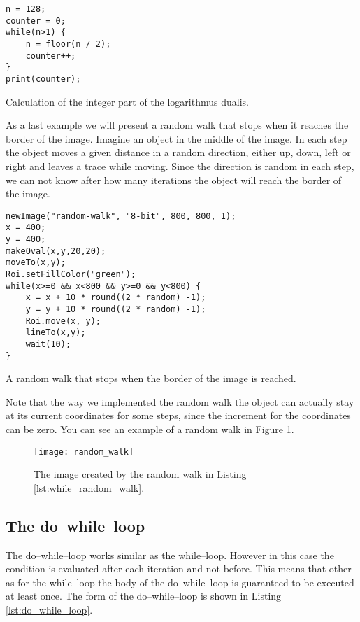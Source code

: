 \begin{listing}[H]
\begin{verbatim}
n = 128;
counter = 0;
while(n>1) {
	n = floor(n / 2);
	counter++;
}
print(counter);
\end{verbatim}
\caption{Calculation of the integer part of the logarithmus dualis.}
\label{lst:while_loop_log_dualis}
\end{listing}

As a last example we will present a random walk that stops when it reaches the border of the image. Imagine an object in the middle of the image. In each step the object moves a given distance in a random direction, either up, down, left or right and leaves a trace while moving. Since the direction is random in each step, we can not know after how many iterations the object will reach the border of the image.

\begin{listing}[H]
\begin{verbatim}
newImage("random-walk", "8-bit", 800, 800, 1);
x = 400;
y = 400;
makeOval(x,y,20,20);
moveTo(x,y);
Roi.setFillColor("green");	
while(x>=0 && x<800 && y>=0 && y<800) {
	x = x + 10 * round((2 * random) -1); 
	y = y + 10 * round((2 * random) -1); 
	Roi.move(x, y);
	lineTo(x,y);
	wait(10);
}
\end{verbatim}
\caption{A random walk that stops when the border of the image is reached.}
\label{lst:while_random_walk}
\end{listing}

Note that the way we implemented the random walk the object can actually stay at its current coordinates for some steps, since the increment for the coordinates can be zero. You can see an example of a random walk in Figure \ref{fig:random_walk}. 

\begin{figure}[h!]
  \centering
    \texttt{[image: random\_walk]}
    \caption[A random walk]{The image created by the random walk in Listing \ref{lst:while_random_walk}.}
    \label{fig:random_walk}
\end{figure}

\subsection{The do--while--loop}

The do--while--loop works similar as the while--loop. However in this case the condition is evaluated after each iteration and not before. This means that other as for the while--loop the body of the do--while--loop is guaranteed to be executed at least once. The form of the do--while--loop is shown in Listing \ref{lst:do_while_loop}. 

